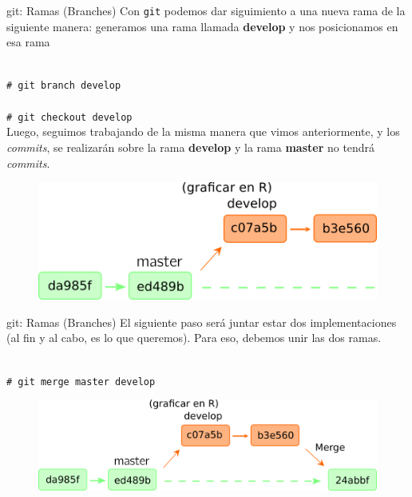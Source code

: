 \documentclass{beamer}
\newcommand{\shellcmd}[1]{\\\indent\indent\texttt{\footnotesize\# #1}\\}
\begin{document}
\begin{frame}{git: Ramas (Branches)}
\noindent Con \texttt{git} podemos dar siguimiento a una nueva rama de la siguiente manera: 
generamos una rama llamada \textbf{develop} y nos posicionamos en esa rama

\shellcmd{git branch develop}
  \vspace{-.5cm}
\shellcmd{git checkout develop}
Luego, seguimos trabajando de la misma manera que vimos anteriormente, y los \textit{commits}, se realizarán sobre la rama \textbf{develop} y la rama \textbf{master} no tendrá \textit{commits}.
\begin{figure}
    \centering
    \includegraphics[scale=0.5]{branch_develop.png}
\end{figure}
\end{frame}




\begin{frame}{git: Ramas (Branches)}
\noindent El siguiente paso será juntar estar dos implementaciones (al fin y al cabo,
es lo que queremos). Para eso, debemos unir las dos ramas.

\shellcmd{git merge master develop}
\begin{figure}
    \centering
    \includegraphics[scale=0.5]{branches.png}
\end{figure}
\end{frame}
\end{document}
